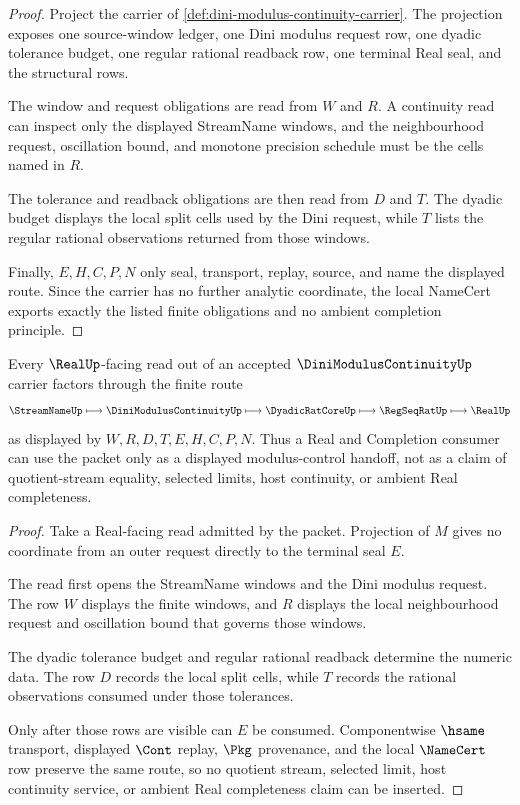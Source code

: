 \begin{proof}
Project the carrier of \autoref{def:dini-modulus-continuity-carrier}. The projection exposes one source-window ledger, one Dini modulus request row, one dyadic tolerance budget, one regular rational readback row, one terminal Real seal, and the structural rows.

The window and request obligations are read from $W$ and $R$. A continuity read can inspect only the displayed StreamName windows, and the neighbourhood request, oscillation bound, and monotone precision schedule must be the cells named in $R$.

The tolerance and readback obligations are then read from $D$ and $T$. The dyadic budget displays the local split cells used by the Dini request, while $T$ lists the regular rational observations returned from those windows.

Finally, $E,H,C,P,N$ only seal, transport, replay, source, and name the displayed route. Since the carrier has no further analytic coordinate, the local NameCert exports exactly the listed finite obligations and no ambient completion principle.
\end{proof}

\begin{theorem}\label{thm:dini-modulus-continuity-real-handoff}
Every $\RealUp$-facing read out of an accepted $\DiniModulusContinuityUp$ carrier factors through the finite route
$$
\StreamNameUp \longmapsto \DiniModulusContinuityUp \longmapsto \DyadicRatCoreUp \longmapsto \RegSeqRatUp \longmapsto \RealUp
$$
as displayed by $W,R,D,T,E,H,C,P,N$. Thus a Real and Completion consumer can use the packet only as a displayed modulus-control handoff, not as a claim of quotient-stream equality, selected limits, host continuity, or ambient Real completeness.
\end{theorem}
\begin{proof}
Take a Real-facing read admitted by the packet. Projection of $M$ gives no coordinate from an outer request directly to the terminal seal $E$.

The read first opens the StreamName windows and the Dini modulus request. The row $W$ displays the finite windows, and $R$ displays the local neighbourhood request and oscillation bound that governs those windows.

The dyadic tolerance budget and regular rational readback determine the numeric data. The row $D$ records the local split cells, while $T$ records the rational observations consumed under those tolerances.

Only after those rows are visible can $E$ be consumed. Componentwise $\hsame$ transport, displayed $\Cont$ replay, $\Pkg$ provenance, and the local $\NameCert$ row preserve the same route, so no quotient stream, selected limit, host continuity service, or ambient Real completeness claim can be inserted.
\end{proof}

